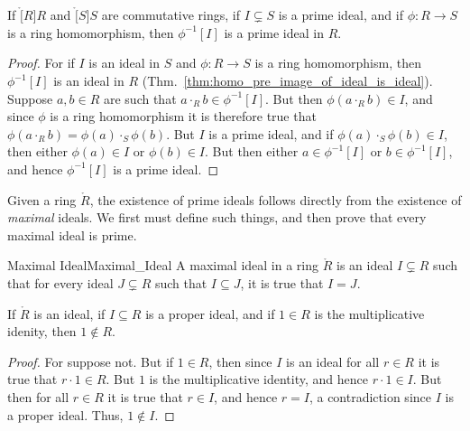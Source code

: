 \documentclass{article}                                                        %
\begin{document}
        \begin{theorem}
            If $\ring[R]{R}$ and $\ring[S]{S}$ are commutative rings, if
            $I\subsetneq{S}$ is a prime ideal, and if $\phi:R\rightarrow{S}$ is
            a ring homomorphism, then $\phi^{\minus{1}}[I]$ is a prime ideal in
            $R$.
        \end{theorem}
        \begin{proof}
            For if $I$ is an ideal in $S$ and $\phi:R\rightarrow{S}$ is a ring
            homomorphism, then $\phi^{\minus{1}}[I]$ is an ideal in $R$
            (Thm.~\ref{thm:homo_pre_image_of_ideal_is_ideal}). Suppose
            $a,b\in{R}$ are such that $a\cdot_{R}b\in\phi^{\minus{1}}[I]$.
            But then $\phi(a\cdot_{R}b)\in{I}$, and since $\phi$ is a ring
            homomorphism it is therefore true that
            $\phi(a\cdot_{R}b)=\phi(a)\cdot_{S}\phi(b)$. But $I$ is a prime
            ideal, and if $\phi(a)\cdot_{S}\phi(b)\in{I}$, then either
            $\phi(a)\in{I}$ or $\phi(b)\in{I}$. But then either
            $a\in\phi^{\minus{1}}[I]$ or $b\in\phi^{\minus{1}}[I]$, and hence
            $\phi^{\minus{1}}[I]$ is a prime ideal.
        \end{proof}
        Given a ring $\ring{R}$, the existence of prime ideals follows directly
        from the existence of \textit{maximal} ideals. We first must define such
        things, and then prove that every maximal ideal is prime.
        \begin{fdefinition}{Maximal Ideal}{Maximal_Ideal}
            A maximal ideal in a ring $\ring{R}$ is an ideal $I\subsetneq{R}$
            such that for every ideal $J\subsetneq{R}$ such that
            $I\subseteq{J}$, it is true that $I=J$.
        \end{fdefinition}
        \begin{theorem}
            \label{thm:Proper_Ideal_Does_Not_Contain_1}%
            If $\ring{R}$ is an ideal, if $I\subseteq{R}$ is a proper ideal, and
            if $1\in{R}$ is the multiplicative idenity, then $1\notin{R}$.
        \end{theorem}
        \begin{proof}
            For suppose not. But if $1\in{R}$, then since $I$ is an ideal for
            all $r\in{R}$ it is true that $r\cdot{1}\in{R}$. But $1$ is the
            multiplicative identity, and hence $r\cdot{1}\in{I}$. But then for
            all $r\in{R}$ it is true that $r\in{I}$, and hence $r=I$, a
            contradiction since $I$ is a proper ideal. Thus, $1\notin{I}$.
        \end{proof}
\end{document}
